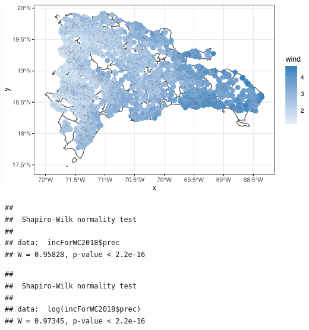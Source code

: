 \documentclass[11pt,]{article}
\newenvironment{Shaded}{\begin{snugshade}}{\end{snugshade}}
\newcommand{\KeywordTok}[1]{\textcolor[rgb]{0.13,0.29,0.53}{\textbf{#1}}}
\newcommand{\CommentTok}[1]{\textcolor[rgb]{0.56,0.35,0.01}{\textit{#1}}}
\newcommand{\OperatorTok}[1]{\textcolor[rgb]{0.81,0.36,0.00}{\textbf{#1}}}
\newcommand{\NormalTok}[1]{#1}
\begin{document}
\includegraphics{proyecto_files/figure-latex/unnamed-chunk-36-4.pdf}

\begin{Shaded}
\end{Shaded}

\begin{verbatim}
## 
##  Shapiro-Wilk normality test
## 
## data:  incForWC2018$prec
## W = 0.95828, p-value < 2.2e-16
\end{verbatim}

\begin{Shaded}
\end{Shaded}

\begin{verbatim}
## 
##  Shapiro-Wilk normality test
## 
## data:  log(incForWC2018$prec)
## W = 0.97345, p-value < 2.2e-16
\end{verbatim}
\end{document}
